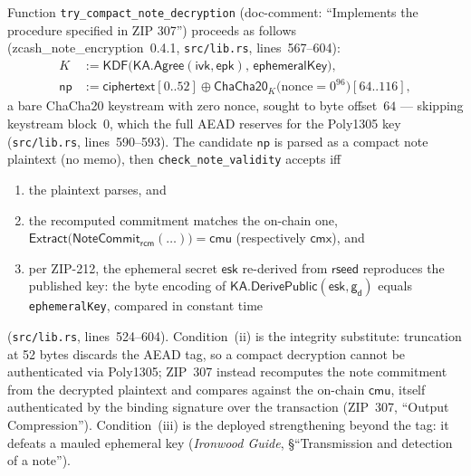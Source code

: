 \documentclass[11pt,a4paper]{article}
\theoremstyle{definition}
\newcommand{\cmx}{\mathsf{cmx}}
\newcommand{\NoteCommit}{\ensuremath{\mathsf{NoteCommit}}}
\newcommand{\Extract}{\ensuremath{\mathsf{Extract}}}
\newcommand{\ivk}{\ensuremath{\mathsf{ivk}}}
\newcommand{\gd}{\ensuremath{\mathsf{g_d}}}
\newcommand{\rcm}{\ensuremath{\mathsf{rcm}}}
\begin{document}
Function \texttt{try\_compact\_note\_decryption} (doc-comment: ``Implements
the procedure specified in ZIP 307'') proceeds as follows
(\textsf{zcash\_note\_encryption}~0.4.1, \texttt{src/lib.rs},
lines~567--604):
\begin{align*}
K &:= \mathsf{KDF}\bigl(\mathsf{KA.Agree}(\ivk, \mathsf{epk}),\,
      \mathsf{ephemeralKey}\bigr),\\
\mathsf{np} &:= \mathsf{ciphertext}[0..52] \oplus
      \mathsf{ChaCha20}_{K}\bigl(\mathrm{nonce} = 0^{96}\bigr)[64..116],
\end{align*}
a bare ChaCha20 keystream with zero nonce, sought to byte offset~$64$ ---
skipping keystream block~0, which the full AEAD reserves for the Poly1305
key (\texttt{src/lib.rs}, lines~590--593). The candidate $\mathsf{np}$ is
parsed as a compact note plaintext (no memo), then
\texttt{check\_note\_validity} accepts iff
\begin{enumerate}[label=(\roman*)]
\item the plaintext parses, and
\item the recomputed commitment matches the on-chain one,
  $\Extract\bigl(\NoteCommit_{\rcm}(\ldots)\bigr) = \mathsf{cmu}$
  (respectively $\cmx$), and
\item per ZIP-212, the ephemeral secret $\mathsf{esk}$ re-derived from
  $\mathsf{rseed}$ reproduces the published key: the byte encoding of
  $\mathsf{KA.DerivePublic}(\mathsf{esk}, \gd)$ equals
  \texttt{ephemeralKey}, compared in constant time
\end{enumerate}
(\texttt{src/lib.rs}, lines~524--604). Condition~(ii) is the integrity
substitute: truncation at 52 bytes discards the AEAD tag, so a compact
decryption cannot be authenticated via Poly1305; ZIP~307 instead recomputes
the note commitment from the decrypted plaintext and compares against the
on-chain $\mathsf{cmu}$, itself authenticated by the binding signature over
the transaction (ZIP~307, ``Output Compression''). Condition~(iii) is the
deployed strengthening beyond the tag: it defeats a mauled ephemeral key
(\emph{Ironwood Guide}, \S``Transmission and detection of a note'').
\end{document}
